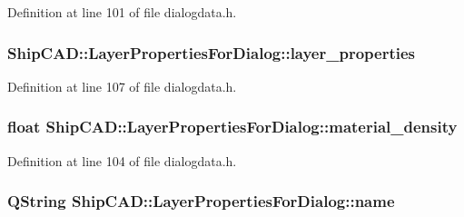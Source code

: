 Definition at line 101 of file dialogdata.\+h.

\subsubsection[{\texorpdfstring{layer\+\_\+properties}{layer_properties}}]{ Ship\+C\+A\+D\+::\+Layer\+Properties\+For\+Dialog\+::layer\+\_\+properties}\hypertarget{structShipCAD_1_1LayerPropertiesForDialog_a3175b253fd29d654cafe5b359f34a2b4}{}\label{structShipCAD_1_1LayerPropertiesForDialog_a3175b253fd29d654cafe5b359f34a2b4}


Definition at line 107 of file dialogdata.\+h.

\subsubsection[{\texorpdfstring{material\+\_\+density}{material_density}}]{\setlength{\rightskip}{0pt plus 5cm}float Ship\+C\+A\+D\+::\+Layer\+Properties\+For\+Dialog\+::material\+\_\+density}\hypertarget{structShipCAD_1_1LayerPropertiesForDialog_a1d0c75ad5128b805bf99aab57212127f}{}\label{structShipCAD_1_1LayerPropertiesForDialog_a1d0c75ad5128b805bf99aab57212127f}


Definition at line 104 of file dialogdata.\+h.

\subsubsection[{\texorpdfstring{name}{name}}]{\setlength{\rightskip}{0pt plus 5cm}Q\+String Ship\+C\+A\+D\+::\+Layer\+Properties\+For\+Dialog\+::name}\hypertarget{structShipCAD_1_1LayerPropertiesForDialog_a09578942af620f75d1599887672ec8da}{}\label{structShipCAD_1_1LayerPropertiesForDialog_a09578942af620f75d1599887672ec8da}


